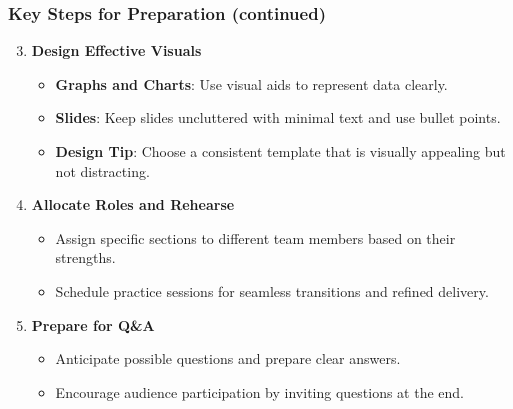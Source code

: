 \documentclass[aspectratio=169]{beamer}
\begin{document}
\begin{frame}[fragile]
    \frametitle{Key Steps for Preparation (continued)}
    \begin{enumerate}
        \setcounter{enumi}{2}
        \item \textbf{Design Effective Visuals}
        \begin{itemize}
            \item \textbf{Graphs and Charts}: Use visual aids to represent data clearly.
            \item \textbf{Slides}: Keep slides uncluttered with minimal text and use bullet points.
            \item \textbf{Design Tip}: Choose a consistent template that is visually appealing but not distracting.
        \end{itemize}

        \item \textbf{Allocate Roles and Rehearse}
        \begin{itemize}
            \item Assign specific sections to different team members based on their strengths.
            \item Schedule practice sessions for seamless transitions and refined delivery.
        \end{itemize}

        \item \textbf{Prepare for Q\&A}
        \begin{itemize}
            \item Anticipate possible questions and prepare clear answers.
            \item Encourage audience participation by inviting questions at the end.
        \end{itemize}
    \end{enumerate}
\end{frame}
\end{document}

